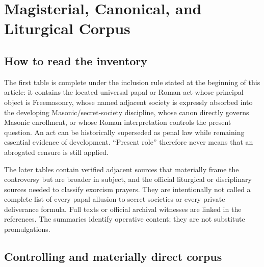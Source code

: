 \section{Magisterial, Canonical, and Liturgical Corpus}
\label{app:freemasonry-corpus}

\subsection{How to read the inventory}

The first table is complete under the inclusion rule stated at the beginning of this article: it contains the located universal papal or Roman act whose principal object is Freemasonry, whose named adjacent society is expressly absorbed into the developing Masonic/secret-society discipline, whose canon directly governs Masonic enrollment, or whose Roman interpretation controls the present question. An act can be historically superseded as penal law while remaining essential evidence of development. “Present role” therefore never means that an abrogated censure is still applied.

The later tables contain verified adjacent sources that materially frame the controversy but are broader in subject, and the official liturgical or disciplinary sources needed to classify exorcism prayers. They are intentionally not called a complete list of every papal allusion to secret societies or every private deliverance formula. Full texts or official archival witnesses are linked in the references. The summaries identify operative content; they are not substitute promulgations.

\subsection{Controlling and materially direct corpus}

